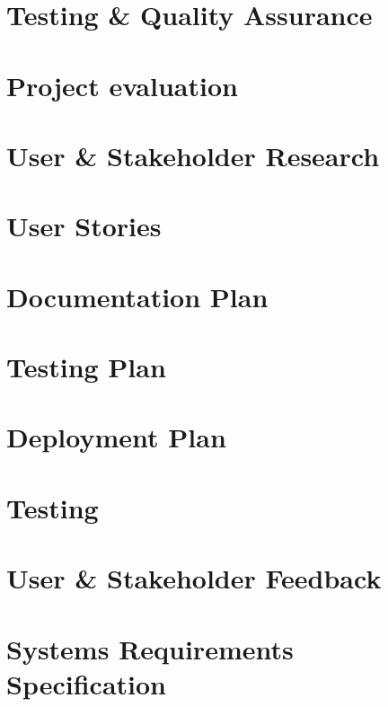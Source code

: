 \documentclass[12pt]{report}
\newcommand\blankpage{%
    \null
    \thispagestyle{empty}%
    \addtocounter{page}{-1}%
    \newpage}
\begin{document}
\chapter{Testing \& Quality Assurance}


\chapter{Project evaluation}


\afterpage{\blankpage}

\begin{appendices}

\chapter{User \& Stakeholder Research}


\chapter{User Stories}


\chapter{Documentation Plan}


\chapter{Testing Plan}


\chapter{Deployment Plan}


\chapter{Testing}


\chapter{User \& Stakeholder Feedback}


\chapter{Systems Requirements Specification}

\end{appendices}

\printbibliography

\afterpage{\blankpage}
\end{document}
